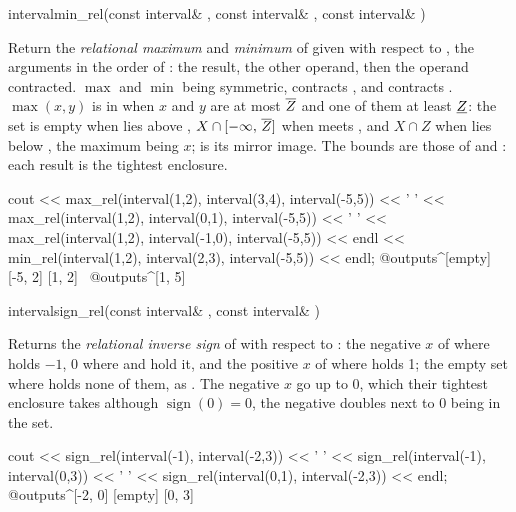 \begin{deffun}{interval}{min\_rel}{(const interval\& , const interval\& , const interval\& )}
  \begin{operation}
  \end{operation}
  Return the \emph{relational maximum} and \emph{minimum} of  given
   with respect to , the arguments in the order of
  : the result, the other operand, then the operand
  contracted. $\max$ and $\min$ being symmetric, 
  contracts , and  contracts .
  $\max(x,y)$ is in  when $x$ and $y$ are at most $\overline{Z}$
  and one of them at least $\underline{Z}$: the set is empty when 
  lies above , $X\cap[-\infty,\,\overline{Z}]$ when 
  meets , and $X\cap Z$ when  lies below , the maximum
  being $x$;  is its mirror image. The bounds are those of
   and : each result is the tightest enclosure.\newinvfive
\begin{example}
cout << max_rel(interval(1,2), interval(3,4), interval(-5,5)) << ' '
     << max_rel(interval(1,2), interval(0,1), interval(-5,5)) << ' '
     << max_rel(interval(1,2), interval(-1,0), interval(-5,5)) << endl
     << min_rel(interval(1,2), interval(2,3), interval(-5,5)) << endl;
@outputs^[empty] [-5, 2] [1, 2]~
@outputs^[1, 5]~
\end{example}
\end{deffun}

\begin{deffun}{interval}{sign\_rel}{(const interval\& , const interval\& )}
  \begin{operation}
  \end{operation}
  Returns the \emph{relational inverse sign} of  with respect to
  : the negative $x$ of  where  holds $-1$, 0 where
   and  hold it, and the positive $x$ of  where 
  holds 1; the empty set where  holds none of them, as
  . The negative $x$ go up to 0, which their tightest
  enclosure takes although $\operatorname{sign}(0)=0$, the negative doubles
  next to 0 being in the set.\newinvfive
\begin{example}
cout << sign_rel(interval(-1), interval(-2,3)) << ' '
     << sign_rel(interval(-1), interval(0,3)) << ' '
     << sign_rel(interval(0,1), interval(-2,3)) << endl;
@outputs^[-2, 0] [empty] [0, 3]~
\end{example}
\end{deffun}

